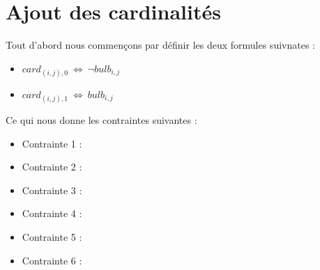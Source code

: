 \documentclass{article}
\begin{document}
\section{Ajout des cardinalités}

Tout d'abord nous commençons par définir les deux formules suivnates :
\begin{itemize}
\item $ card_{(i,j),0}~\Leftrightarrow~\neg bulb_{i,j} $
\item $ card_{(i,j),1}~\Leftrightarrow~bulb_{i,j} $\\
\end{itemize}
Ce qui nous donne les contraintes suivantes :
\begin{itemize}
\item Contrainte 1 :
\item Contrainte 2 :
\item Contrainte 3 :
\item Contrainte 4 :
\item Contrainte 5 :
\item Contrainte 6 :
\end{itemize}
\end{document}

